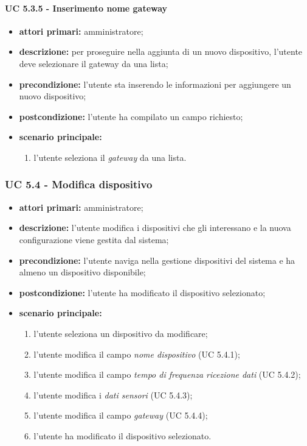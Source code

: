 				\paragraph{UC 5.3.5 - Inserimento nome gateway}
				\begin{itemize}
					\item \textbf{attori primari:} amministratore;
					\item \textbf{descrizione:} per proseguire nella aggiunta di un nuovo dispositivo, l'utente deve selezionare il gateway da una lista;
					\item \textbf{precondizione:} l'utente sta inserendo le informazioni per aggiungere un nuovo dispositivo;
					\item \textbf{postcondizione:} l'utente ha compilato un campo richiesto;
					\item \textbf{scenario principale:}
					\begin{enumerate}
						\item{l'utente seleziona il \textit{gateway} da una lista.}
					\end{enumerate}
				\end{itemize}

			\subsubsection{UC 5.4 - Modifica dispositivo}
			\begin{itemize}
				\item \textbf{attori primari:} amministratore;
				\item \textbf{descrizione:} l'utente modifica i dispositivi che gli interessano e la nuova configurazione viene gestita dal sistema;
				\item \textbf{precondizione:} l'utente naviga nella gestione dispositivi del sistema e ha almeno un dispositivo disponibile;
				\item \textbf{postcondizione:} l'utente ha modificato il dispositivo selezionato;
				\item \textbf{scenario principale:}
				\begin{enumerate}
					\item{l'utente seleziona un dispositivo da modificare;}
					\item{l'utente modifica il campo \textit{nome dispositivo} (UC 5.4.1);}
					\item{l'utente modifica il campo \textit{tempo di frequenza ricezione dati} (UC 5.4.2);}
					\item{l'utente modifica i \textit{dati sensori} (UC 5.4.3);}
					\item{l'utente modifica il campo \textit{gateway} (UC 5.4.4);}
					\item{l'utente ha modificato il dispositivo selezionato.}
				\end{enumerate}
			\end{itemize}

